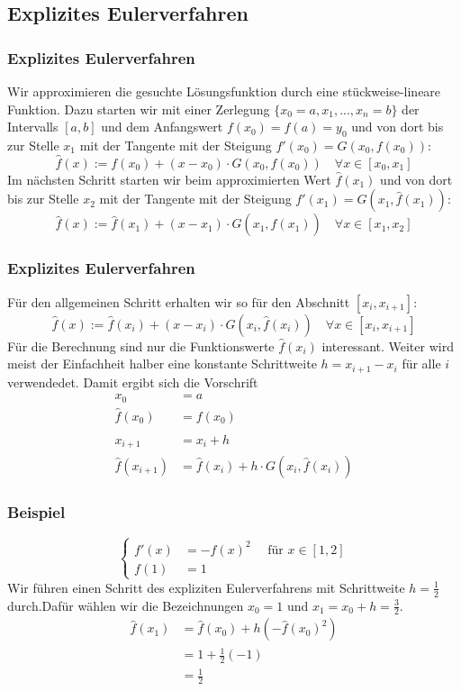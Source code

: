 \subsection{Explizites Eulerverfahren}
\begin{frame}\frametitle{Explizites Eulerverfahren}
Wir approximieren die gesuchte Lösungsfunktion durch eine stückweise-lineare Funktion. Dazu starten wir mit einer Zerlegung $\{x_0=a,x_1,...,x_n=b\}$ der Intervalls $[a,b]$ und dem Anfangswert $f(x_0)=f(a)=y_0$ und von dort bis zur Stelle $x_1$ mit der Tangente mit der Steigung $f'(x_0)=G(x_0,f(x_0))$:
$$
\hat f(x):= f(x_0)+ (x-x_0)\cdot G(x_0,f(x_0)) \quad \forall x \in [x_0,x_1]
$$
\pause
Im nächsten Schritt starten wir beim approximierten Wert $\hat f(x_1)$ und von dort bis zur Stelle $x_2$ mit der Tangente mit der Steigung $f'(x_1)=G(x_1,\hat f(x_1))$:
$$
\hat f(x):= \hat f(x_1)+ (x-x_1)\cdot G(x_1,\hat f(x_1)) \quad \forall x \in [x_1,x_2]
$$
\end{frame}
%
\begin{frame}\frametitle{Explizites Eulerverfahren}
Für den allgemeinen Schritt erhalten wir so für den Abschnitt $[x_i,x_{i+1}]$:
$$
\hat f(x):= \hat f(x_i)+ (x-x_i)\cdot G(x_i,\hat f(x_i)) \quad \forall x \in [x_i,x_{i+1}]
$$
\pause
Für die Berechnung sind nur die Funktionswerte $\hat f(x_i)$ interessant. Weiter wird meist der Einfachheit halber eine konstante Schrittweite $h=x_{i+1}-x_i$ für alle $i$ verwendedet. Damit ergibt sich die Vorschrift
\begin{align*}
x_0&=a\\
\hat f(x_0)&=f(x_0)\\
&\\
x_{i+1}&=x_i+h\\
\hat f(x_{i+1})&=\hat f(x_i)+h\cdot G(x_i,\hat f(x_i))
\end{align*}
\end{frame}
%
\begin{frame}\frametitle{Beispiel}
$$
\begin{cases}
f'(x)&=-f(x)^2 \quad \text{ für } x \in [1,2]\\
f(1)&=1
\end{cases}
$$
\vfill
Wir führen einen Schritt des expliziten Eulerverfahrens mit Schrittweite $h=\frac{1}{2}$ durch.\pause Dafür wählen wir die Bezeichnungen $x_0=1$ und $x_1=x_0+h=\frac{3}{2}$.
\begin{align*}
\hat f(x_1)&=\hat f(x_0)+h(-  \hat f(x_0)^2)\\
&=1+\frac{1}{2}(-1)\\
&=\frac{1}{2}
\end{align*}
\end{frame}
%
